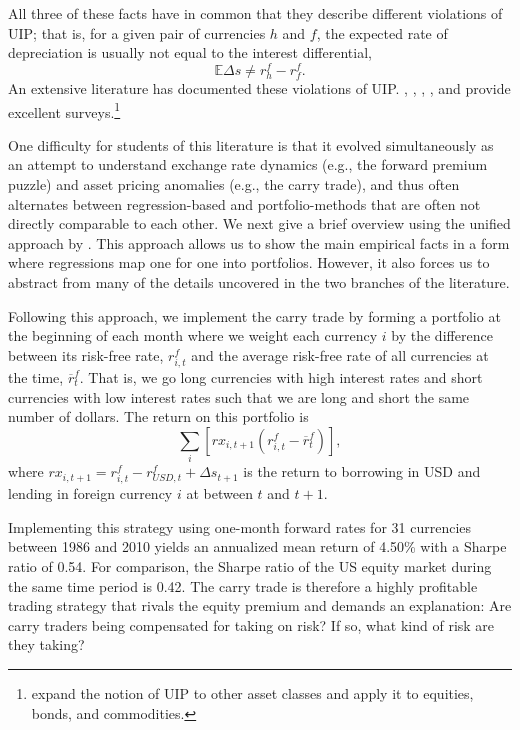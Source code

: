 \documentclass{ar-1col}
\begin{document}
All three of these facts have in common that they describe different violations of UIP; that is, for a given pair of currencies $h$ and $f$, the expected rate of depreciation is usually not equal to the interest differential, $$\mathbb{E}\Delta s \neq r^f_h-r^f_f.$$ An extensive literature has documented these violations of UIP. \citet{Hodrick1987}, \citet{FrootThaler1990}, \citet{Engel1996}, \citet{Lewis2011}, and \citet{Engel2014} provide excellent surveys.\footnote{\cite{Koijen2018Carry} expand the notion of UIP to other asset classes and apply it to equities, bonds, and commodities.}

One difficulty for students of this literature is that it evolved simultaneously as an attempt to understand exchange rate dynamics (e.g., the forward premium puzzle) and asset pricing anomalies (e.g., the carry trade), and thus often alternates between regression-based and portfolio-methods that are often not directly comparable to each other. We next give a brief overview using the unified approach by \citet{HassanMano2019}. This approach allows us to show the main empirical facts in a form where regressions map one for one into portfolios. However, it also forces us to abstract from many of the details uncovered in the two branches of the literature.

Following this approach, we implement the carry trade by forming a portfolio at the beginning of each month where we weight each currency $i$ by the difference between its risk-free rate, $r^f_{i, t}$ and the average risk-free rate of all currencies at the time, $\overline{r}^f_t$. That is, we go long currencies with high interest rates and short currencies with low interest rates such that we are long and short the same number of dollars. The return on this portfolio is
\begin{equation}
  \label{eq_carry}
  \textstyle\sum_{i}\left[ rx_{i, t+1}\left( r^f_{i, t}-\overline{r}^f_{t}\right) \right] ,
\end{equation}%
where $rx_{i, t+1} = r^f_{i, t} - r^f_{USD, t} + \Delta s_{t + 1}$ is the return to borrowing in USD and lending in foreign currency $i$ at between $t$ and $t+1$.

Implementing this strategy using one-month forward rates for 31 currencies between 1986 and 2010 yields an annualized mean return of 4.50\% with a Sharpe ratio of 0.54. For comparison, the Sharpe ratio of the US equity market during the same time period is 0.42. The carry trade is therefore a highly profitable trading strategy that rivals the equity premium and demands an explanation: Are carry traders being compensated for taking on risk? If so, what kind of risk are they taking?
\end{document}
